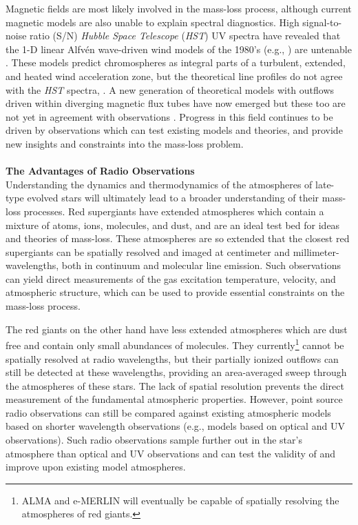 Magnetic fields are most likely involved in the mass-loss process, although current magnetic models are also unable to explain spectral diagnostics. High signal-to-noise ratio (S/N) \textit{Hubble Space Telescope} (\textit{HST}) UV spectra have revealed that the 1-D linear Alfv\'en wave-driven wind models of the 1980’s (e.g., \citealt{hartmann_1980,harper_1988}) are untenable \citep{harper_2001}. These models predict chromospheres as integral parts of a turbulent, extended, and heated wind acceleration zone, but the theoretical line profiles do not agree with the \textit{HST} spectra, \cite[e.g.,][]{judge_1998}. A new generation of theoretical models with outflows driven within diverging magnetic flux tubes have now emerged \citep{falceta_2006, suzuki_2007} but these too are not yet in agreement with observations \citep{crowley_2009}. Progress in this field continues to be driven by observations which can test existing models and theories, and provide new insights and constraints into the mass-loss problem.\\
\\
\textbf{The Advantages of Radio Observations}\\
Understanding the dynamics and thermodynamics of the atmospheres of late-type evolved stars will ultimately lead to a broader understanding of their mass-loss processes. Red supergiants have extended atmospheres which contain a mixture of atoms, ions, molecules, and dust, and are an ideal test bed for ideas and theories of mass-loss. These atmospheres are so extended that the closest red supergiants can be spatially resolved and imaged at centimeter and millimeter-wavelengths, both in continuum and molecular line emission. Such observations can yield direct measurements of the gas excitation temperature, velocity, and atmospheric structure, which can be used to provide essential constraints on the mass-loss process. 

The red giants on the other hand have less extended atmospheres which are dust free and contain only small abundances of molecules. They currently\footnote{ALMA and e-MERLIN will eventually be capable of spatially resolving the atmospheres of red giants.} cannot be spatially resolved at radio wavelengths, but their partially ionized outflows can still be detected at these wavelengths, providing an area-averaged sweep through the atmospheres of these stars. The lack of spatial resolution prevents the direct measurement of the fundamental atmospheric properties. However, point source radio observations can still be compared against existing atmospheric models based on shorter wavelength observations (e.g., models based on optical and UV observations). Such radio observations sample further out in the star's atmosphere than optical and UV observations and can test the validity of and improve upon existing model atmospheres. 

